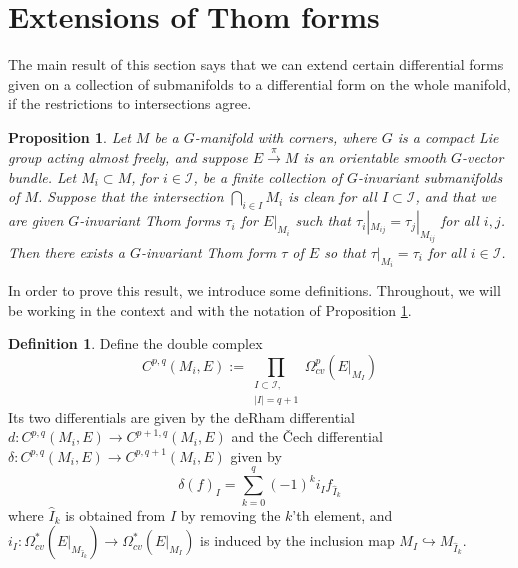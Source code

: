 \documentclass[11pt,psamsfonts, oneside, reqno]{amsart}
\newcommand{\sub}{\subset}%
\newcommand{\p}[2]{\prod\limits_{#1}{#2} }
\newcommand{\cl}{\colon}
\newcommand{\xra}{\xrightarrow}
\newcommand{\cI}{\mathcal{I}}
\newtheorem{proposition}[theorem]{Proposition}
\theoremstyle{definition}
\newtheorem{definition}[theorem]{Definition}
\theoremstyle{remark}
\numberwithin{equation}{section}
\begin{document}
\section{Extensions of Thom forms}\label{sec:extend-Thom-forms}
The main result of this section says that we can extend certain differential forms given on a collection of submanifolds to a differential form on the whole manifold, if the restrictions to intersections agree. 

\begin{proposition}\label{prop:extend-thom-form} Let $M$ be a  $G$-manifold with corners, where $G$ is a compact Lie group acting almost freely, and suppose $E\xra{\pi} M$ is an orientable smooth $G$-vector bundle. Let $M_i \subset M$, for $i \in \cI$, be a finite collection of $G$-invariant submanifolds of $M$. Suppose that the intersection $\bigcap_{i \in I} M_i$ is clean for all $I\sub \cI$, and that we are given $G$-invariant Thom forms $\tau_i$ for $E|_{M_i}$ such that $\tau_i|_{M_{ij}} = \tau_j|_{M_{ij}}$ for all $i,j$. Then there exists a $G$-invariant Thom form $\tau$ of $E$ so that $\tau|_{M_i} = \tau_i$ for all $i\in \cI$.
\end{proposition}

In order to prove this result, we introduce some definitions. Throughout, we will be working in the context and with the notation of Proposition \ref{prop:extend-thom-form}.

\begin{definition}
	Define the double complex \begin{equation}
		C^{p,q}(M_i, E) := \p{\substack{I\sub \cI,\\|I| = q+1}}{\Omega_{cv}^p(E|_{M_I}) }
	\end{equation}
	Its two differentials are given by the deRham differential $d\cl C^{p,q}(M_i, E) \rightarrow C^{p+1,q}(M_i, E)$ and the \v{C}ech differential $\delta\cl C^{p,q}(M_i, E) \rightarrow C^{p,q+1}(M_i, E)$ given by 
	\begin{equation*}
		\delta(f)_{I} = \sum^{q}_{k = 0} (-1)^k i_{I}f_{\hat{I}_k}
	\end{equation*}
	where $\hat{I}_k$ is obtained from $I$ by removing the $k$'th element, and $i_{I}\cl \Omega^*_{cv}(E|_{M_{\hat{I}_k}}) \rightarrow \Omega^*_{cv}(E|_{M_I})$ is induced by the inclusion map $M_I \hookrightarrow M_{\hat{I}_k}$.
\end{definition}
\end{document}
